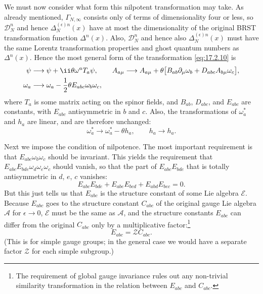 We must now consider what form this nilpotent transformation may take. As already mentioned, $\Gamma_{N,\infty}$ consists only of terms of dimensionality four or less, so $\mathcal D_N^n$ and hence $\Delta_N^{(\epsilon)n}(x)$ have at most the dimensionality of the original BRST transformation function $\Delta^n(x)$. Also, $\mathcal D_N^n$ and hence also $\Delta_N^{(\epsilon)n}(x)$ must have the same Lorentz transformation properties and ghost quantum numbers as $\Delta^n(x)$. Hence the most general form of the transformation \eqref{eq:17.2.10} is
\begin{align*}
\psi&\longrightarrow\psi+\ii\theta\omega^a T_a\psi,\qquad
A_{a\mu}\longrightarrow A_{a\mu}
+\theta\bigl[B_{ab}\partial_\mu\omega_b
+D_{abc}A_{b\mu}\omega_c\bigr],\notag\\
\omega_a&\longrightarrow\omega_a
-\frac12\theta E_{abc}\omega_b\omega_c,
\end{align*}
where $T_a$ is some matrix acting on the spinor fields, and $B_{ab}$, $D_{abc}$, and $E_{abc}$ are constants, with $E_{abc}$ antisymmetric in $b$ and $c$. Also, the transformations of $\omega_a^*$ and $h_a$ are linear, and are therefore unchanged:
\[
\omega_a^*\longrightarrow\omega_a^*-\theta h_a,
\qquad h_a\longrightarrow h_a.
\]

Next we impose the condition of nilpotence. The most important requirement is that $E_{abc}\omega_b\omega_c$ should be invariant. This yields the requirement that $E_{abc}E_{bde}\omega_d\omega_e\omega_c$ should vanish, so that the part of $E_{abc}E_{bde}$ that is totally antisymmetric in $d$, $e$, $c$ vanishes:
\[
E_{abc}E_{bde}
+E_{abe}E_{bcd}
+E_{abd}E_{bec}=0.
\]
But this just tells us that $E_{abc}$ is the structure constant of some Lie algebra $\mathcal E$. Because $E_{abc}$ goes to the structure constant $C_{abc}$ of the original gauge Lie algebra $\mathcal A$ for $\epsilon\to0$, $\mathcal E$ must be the same as $\mathcal A$, and the structure constants $E_{abc}$ can differ from the original $C_{abc}$ only by a multiplicative factor:\footnote{The requirement of global gauge invariance rules out any non-trivial similarity transformation in the relation between $E_{abc}$ and $C_{abc}$.}
\[
E_{abc}=\mathcal Z C_{abc}.
\]
(This is for simple gauge groups; in the general case we would have a separate factor $\mathcal Z$ for each simple subgroup.)

